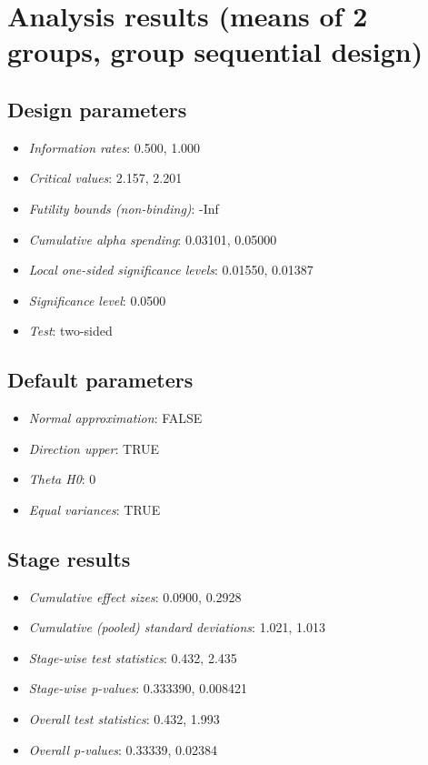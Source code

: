 \documentclass[
  letterpaper,
  DIV=11,
  numbers=noendperiod]{scrreprt}
\providecommand{\tightlist}{%
  \setlength{\itemsep}{0pt}\setlength{\parskip}{0pt}}\usepackage{longtable,booktabs,array}
\begin{document}
\hypertarget{analysis-results-means-of-2-groups-group-sequential-design}{%
\section{Analysis results (means of 2 groups, group sequential
design)}\label{analysis-results-means-of-2-groups-group-sequential-design}}

\hypertarget{design-parameters-3}{%
\subsection{Design parameters}\label{design-parameters-3}}

\begin{itemize}
\tightlist
\item
  \emph{Information rates}: 0.500, 1.000
\item
  \emph{Critical values}: 2.157, 2.201
\item
  \emph{Futility bounds (non-binding)}: -Inf
\item
  \emph{Cumulative alpha spending}: 0.03101, 0.05000
\item
  \emph{Local one-sided significance levels}: 0.01550, 0.01387
\item
  \emph{Significance level}: 0.0500
\item
  \emph{Test}: two-sided
\end{itemize}

\hypertarget{default-parameters-4}{%
\subsection{Default parameters}\label{default-parameters-4}}

\begin{itemize}
\tightlist
\item
  \emph{Normal approximation}: FALSE
\item
  \emph{Direction upper}: TRUE
\item
  \emph{Theta H0}: 0
\item
  \emph{Equal variances}: TRUE
\end{itemize}

\hypertarget{stage-results}{%
\subsection{Stage results}\label{stage-results}}

\begin{itemize}
\tightlist
\item
  \emph{Cumulative effect sizes}: 0.0900, 0.2928
\item
  \emph{Cumulative (pooled) standard deviations}: 1.021, 1.013
\item
  \emph{Stage-wise test statistics}: 0.432, 2.435
\item
  \emph{Stage-wise p-values}: 0.333390, 0.008421
\item
  \emph{Overall test statistics}: 0.432, 1.993
\item
  \emph{Overall p-values}: 0.33339, 0.02384
\end{itemize}
\end{document}
